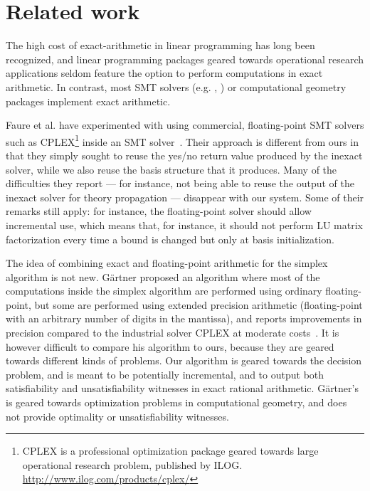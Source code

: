 \section{Related work}
The high cost of exact-arithmetic in linear programming has long been recognized, and linear programming packages geared towards operational research applications seldom feature the option to perform computations in exact arithmetic. In contrast, most SMT solvers (e.g. , ) or computational geometry packages implement exact arithmetic.

Faure et al. have experimented with using commercial, floating-point SMT solvers such as CPLEX\footnote{CPLEX is a professional optimization package geared towards large operational research problem, published by ILOG. \url{http://www.ilog.com/products/cplex/}}
inside an SMT solver~\cite{Faure_et_al_SAT08}. Their approach is different from ours in that they simply sought to reuse the yes/no return value produced by the inexact solver, while we also reuse the basis structure that it produces. Many of the difficulties they report --- for instance, not being able to reuse the output of the inexact solver for theory propagation --- disappear with our system. Some of their remarks still apply: for instance, the floating-point solver should allow incremental use, which means that, for instance, it should not perform LU matrix factorization every time a bound is changed but only at basis initialization.

The idea of combining exact and floating-point arithmetic for the simplex algorithm is not new. G\"artner proposed an algorithm where most of the computations inside the simplex algorithm are performed using ordinary floating-point, but some are performed using extended precision arithmetic (floating-point with an arbitrary number of digits in the mantissa), and reports improvements in precision compared to the industrial solver CPLEX at moderate costs~\cite{Gaertner_SODA98}. It is however difficult to compare his algorithm to ours, because they are geared towards different kinds of problems. Our algorithm is geared towards the decision problem, and is meant to be potentially incremental, and to output both satisfiability and unsatisfiability witnesses in exact rational arithmetic. G\"artner's is geared towards optimization problems in computational geometry, and does not provide optimality or unsatisfiability witnesses.

